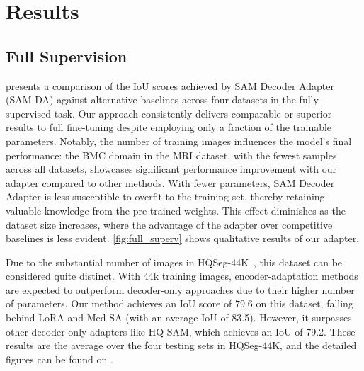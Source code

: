 \section{Results}
\label{sec:results}



\subsection{Full Supervision}
 presents a comparison of the IoU scores achieved by SAM Decoder Adapter (SAM-DA) against alternative baselines across four datasets in the fully supervised task. Our approach consistently delivers comparable or superior results to full fine-tuning despite employing only a fraction of the trainable parameters. Notably, the number of training images influences the model's final performance: the BMC domain in the MRI dataset, with the fewest samples across all datasets, showcases significant performance improvement with our adapter compared to other methods. With fewer parameters, SAM Decoder Adapter is less susceptible to overfit to the training set, thereby retaining valuable knowledge from the pre-trained weights. This effect diminishes as the dataset size increases, where the advantage of the adapter over competitive baselines is less evident. \cref{fig:full_superv} shows qualitative results of our adapter.



Due to the substantial number of images in HQSeg-44K~, this dataset can be considered quite distinct. With 44k training images, encoder-adaptation methods are expected to outperform decoder-only approaches due to their higher number of parameters. Our method achieves an IoU score of 79.6 on this dataset, falling behind LoRA and Med-SA (with an average IoU of 83.5). However, it surpasses other decoder-only adapters like HQ-SAM, which achieves an IoU of 79.2. These results are the average over the four testing sets in HQSeg-44K, and the detailed figures can be found on .

